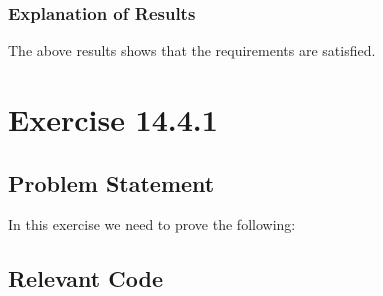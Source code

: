 \documentclass{report}
\begin{document}
\subsection{Explanation of Results}
\label{sec:explanation-results-2}
The above results shows that the requirements are satisfied.



 \chapter{Exercise 14.4.1}
 \label{cha:exercise-14-4-1}
  
 \section{Problem Statement}
 \label{sec:problem-statement-3}

In this exercise we need to prove the following:  
\HOLconopsZeroSolutionDatatypescommands
\HOLconopsZeroSolutionTheoremsOpRuleLaunchXXthm
\HOLconopsZeroSolutionTheoremsOpRuleAbortXXthm
\HOLconopsZeroSolutionTheoremsApRuleActivateXXthm
\HOLconopsZeroSolutionTheoremsApRuleStandDownXXthm


\section{Relevant Code}
\label{sec:relevant-code-3}

\end{document}
